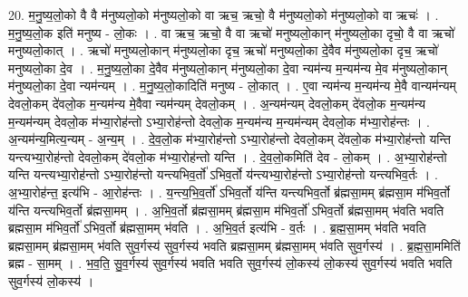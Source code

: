 \documentclass[17pt]{extarticle}
\begin{document}
20. म॒नु॒ष्य॒लो॒को वै वै म॑नुष्यलो॒को म॑नुष्यलो॒को वा ऋच॒ ऋचो॒ वै म॑नुष्यलो॒को म॑नुष्यलो॒को वा ऋचः॑ । . म॒नु॒ष्य॒लो॒क इति॑ मनुष्य - लो॒कः । . वा ऋच॒ ऋचो॒ वै वा ऋचो॑ मनुष्यलो॒कान् म॑नुष्यलो॒का दृचो॒ वै वा ऋचो॑ मनुष्यलो॒कात् । . ऋचो॑ मनुष्यलो॒कान् म॑नुष्यलो॒का दृच॒ ऋचो॑ मनुष्यलो॒का दे॒वैव म॑नुष्यलो॒का दृच॒ ऋचो॑ मनुष्यलो॒का दे॒व । . म॒नु॒ष्य॒लो॒का दे॒वैव म॑नुष्यलो॒कान् म॑नुष्यलो॒का दे॒वा न्यम॑न्य म॒न्यम॑न्य मे॒व म॑नुष्यलो॒कान् म॑नुष्यलो॒का दे॒वा न्यम॑न्यम् । . म॒नु॒ष्य॒लो॒कादिति॑ मनुष्य - लो॒कात् । . ए॒वा न्यम॑न्य म॒न्यम॑न्य मे॒वै वान्यम॑न्यम् देवलो॒कम् दे॑वलो॒क म॒न्यम॑न्य मे॒वैवा न्यम॑न्यम् देवलो॒कम् । . अ॒न्यम॑न्यम् देवलो॒कम् दे॑वलो॒क म॒न्यम॑न्य म॒न्यम॑न्यम् देवलो॒क म॑भ्या॒रोह॑न्तो ऽभ्या॒रोह॑न्तो देवलो॒क म॒न्यम॑न्य म॒न्यम॑न्यम् देवलो॒क म॑भ्या॒रोह॑न्तः । . अ॒न्यम॑न्य॒मित्य॒न्यम् - अ॒न्य॒म् । . दे॒व॒लो॒क म॑भ्या॒रोह॑न्तो ऽभ्या॒रोह॑न्तो देवलो॒कम् दे॑वलो॒क म॑भ्या॒रोह॑न्तो यन्ति यन्त्यभ्या॒रोह॑न्तो देवलो॒कम् दे॑वलो॒क म॑भ्या॒रोह॑न्तो यन्ति । . दे॒व॒लो॒कमिति॑ देव - लो॒कम् । . अ॒भ्या॒रोह॑न्तो यन्ति यन्त्यभ्या॒रोह॑न्तो ऽभ्या॒रोह॑न्तो यन्त्यभिव॒र्तो॑ ऽभिव॒र्तो य॑न्त्यभ्या॒रोह॑न्तो ऽभ्या॒रोह॑न्तो यन्त्यभिव॒र्तः । . अ॒भ्या॒रोह॑न्त॒ इत्य॑भि - आ॒रोह॑न्तः । . य॒न्त्य॒भि॒व॒र्तो॑ ऽभिव॒र्तो य॑न्ति यन्त्यभिव॒र्तो ब्र॑ह्मसा॒मम् ब्र॑ह्मसा॒म म॑भिव॒र्तो य॑न्ति यन्त्यभिव॒र्तो ब्र॑ह्मसा॒मम् । . अ॒भि॒व॒र्तो ब्र॑ह्मसा॒मम् ब्र॑ह्मसा॒म म॑भिव॒र्तो॑ ऽभिव॒र्तो ब्र॑ह्मसा॒मम् भ॑वति भवति ब्रह्मसा॒म म॑भिव॒र्तो॑ ऽभिव॒र्तो ब्र॑ह्मसा॒मम् भ॑वति । . अ॒भि॒व॒र्त इत्य॑भि - व॒र्तः । . ब्र॒ह्म॒सा॒मम् भ॑वति भवति ब्रह्मसा॒मम् ब्र॑ह्मसा॒मम् भ॑वति सुव॒र्गस्य॑ सुव॒र्गस्य॑ भवति ब्रह्मसा॒मम् ब्र॑ह्मसा॒मम् भ॑वति सुव॒र्गस्य॑ । . ब्र॒ह्म॒सा॒ममिति॑ ब्रह्म - सा॒मम् । . भ॒व॒ति॒ सु॒व॒र्गस्य॑ सुव॒र्गस्य॑ भवति भवति सुव॒र्गस्य॑ लो॒कस्य॑ लो॒कस्य॑ सुव॒र्गस्य॑ भवति भवति सुव॒र्गस्य॑ लो॒कस्य॑ । \newline
\end{document}
